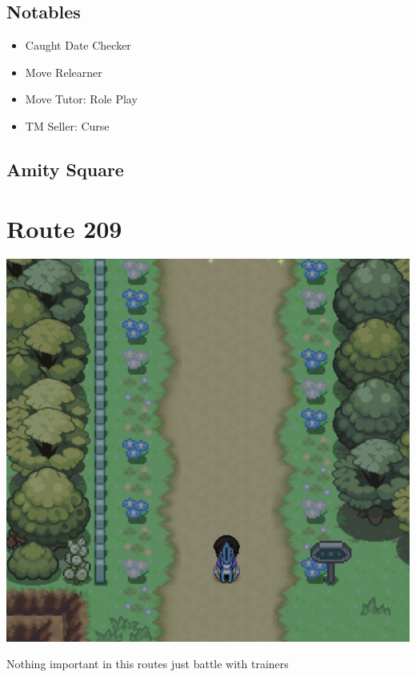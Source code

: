 \documentclass[11pt]{article}
\begin{document}
\subsection{Notables}\label{subsec:notables-hearthome}

\begin{itemize}
    \item Caught Date Checker
    \item Move Relearner
    \item Move Tutor: Role Play
    \item TM Seller: Curse
\end{itemize}

\subsection{Amity Square}\label{subsec:amity-square}




\section{Route 209}\label{sec:Route_209}

\includegraphics[width=\textwidth]{walkthrough/Sinnoh/Route_209}

Nothing important in this routes just battle with trainers
\end{document}
